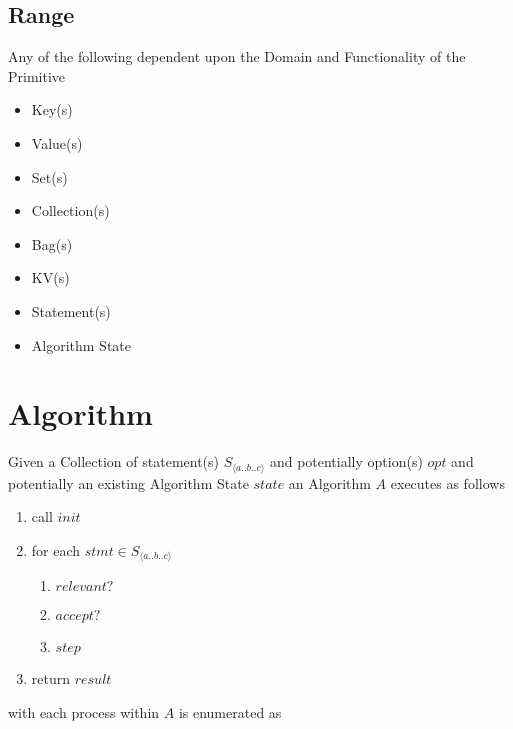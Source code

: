 \documentclass[../main.tex]{subfiles}
\begin{document}
\subsection{Range}
Any of the following dependent upon the Domain and Functionality of the Primitive

\begin{itemize}
\item Key(s)
\item Value(s)
\item Set(s)
\item Collection(s)
\item Bag(s)
\item KV(s)
\item Statement(s)
\item Algorithm State
\end{itemize}

\section{Algorithm}
Given a Collection of statement(s) $S_{\langle a..b..c \rangle}$ and potentially option(s) $opt$ and potentially an existing Algorithm State $state$ an Algorithm $A$ executes as follows

\begin{enumerate}
\item call $init$
\item for each $stmt \in S_{\langle a..b..c \rangle}$
  \begin{enumerate}
  \item $relevant?$
  \item $accept?$
  \item $step$
  \end{enumerate}
\item return $result$
\end{enumerate}
with each process within $A$ is enumerated as
\end{document}
